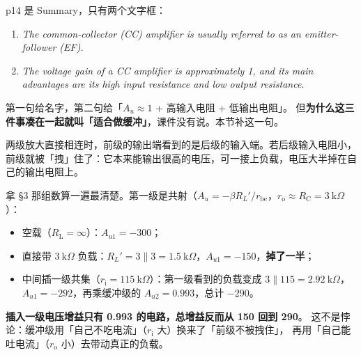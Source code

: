 \documentclass[11pt]{ctexart}
\begin{document}


p14 是 Summary，只有两个文字框：
\begin{enumerate}
\item \textit{The common-collector (CC) amplifier is usually referred to as an emitter-follower (EF).}
\item \textit{The voltage gain of a CC amplifier is approximately 1, and its main advantages are its high input resistance and low output resistance.}
\end{enumerate}
第一句给名字，第二句给「$A_u\approx1$ + 高输入电阻 + 低输出电阻」。
但\textbf{为什么这三件事凑在一起就叫「适合做缓冲」}，课件没有说。本节补这一句。


两级放大直接相连时，前级的输出端看到的是后级的输入端。若后级输入电阻小，
前级就被「拽」住了：它本来能输出很高的电压，可一接上负载，电压大半掉在自己的输出电阻上。

拿 §3 那组数算一遍最清楚。第一级是共射（$A_u=-\beta R_L'/r_{\mathrm{be}}$，$r_{\mathrm{o}}\approx R_{\mathrm{C}}=3\ \mathrm{k}\Omega$）：
\begin{itemize}
\item 空载（$R_{\mathrm{L}}=\infty$）：$A_{u1}=-300$；
\item 直接带 $3\ \mathrm{k}\Omega$ 负载：$R_L'=3\parallel3=1.5\ \mathrm{k}\Omega$，$A_{u1}=-150$，\textbf{掉了一半}；
\item 中间插一级共集（$r_{\mathrm{i}}=115\ \mathrm{k}\Omega$）：第一级看到的负载变成 $3\parallel115=2.92\ \mathrm{k}\Omega$，
$A_{u1}=-292$，再乘缓冲级的 $A_{u2}=0.993$，总计 $-290$。
\end{itemize}
\textbf{插入一级电压增益只有 0.993 的电路，总增益反而从 150 回到 290}。
这不是悖论：缓冲级用「自己不吃电流」（$r_{\mathrm{i}}$ 大）换来了「前级不被拽住」，
再用「自己能吐电流」（$r_{\mathrm{o}}$ 小）去带动真正的负载。


\end{document}
